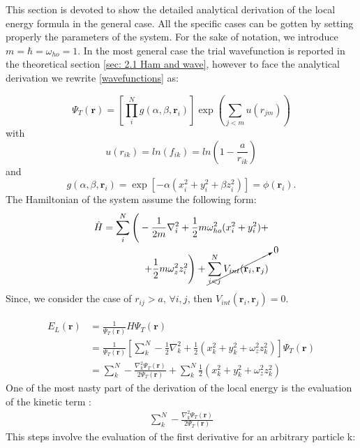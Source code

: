 
This section is devoted to show the detailed analytical derivation of the local energy formula in the general case. All the specific cases can be gotten by setting properly the parameters of the system.
For the sake of notation, we introduce $m=\hbar=\omega_{ho}=1$.  
In the most general case the trial wavefunction is reported in the theoretical section \ref{sec: 2.1 Ham and wave}, however to face the analytical derivation we rewrite \ref{wavefunctions} as:

\begin{equation*}
    \Psi_T(\mathbf{r})=\left[ \prod_i^N g(\alpha,\beta,\mathbf{r}_i) \right] \exp{\left(\sum_{j<m}u(r_{jm})\right)}
\end{equation*} 
with 
\begin{equation}
    u(r_{ik})=ln(f_{ik})=ln(1-\frac{a}{r_{ik}})
    \label{eq: u_interaction}
\end{equation}
and
\begin{equation}
    g(\alpha,\beta,\mathbf{r}_i) = \exp{\left[-\alpha(x_i^2+y_i^2+\beta
    z_i^2)\right]}= \phi(\mathbf{r}_i).
    \label{eq:gauss}
\end{equation} 
The Hamiltonian of the system assume the following form: 
\begin{equation*}
    \begin{split}
    \hat{H} = \sum_i^N \Bigg( -\frac{1}{2m} \nabla_{i}^2 + \frac{1}{2} m \omega_{ho}^2 (x_i^2 + y_i^2) + \\ 
    +\frac{1}{2} m \omega_{z}^2 z_i^2\Bigg) 
    + \cancelto{0}{\sum_{i<j}^{N} V_{int}({\mathbf{r}}_i,{\mathbf{r}}_j)} 
    \end{split}
\end{equation*}
Since, we consider the %
case of $r_{ij}>a,\, \forall i,j$, then  $V_{int}(\mathbf{r}_i,\mathbf{r}_j) = 0$.


\begin{align}
    E_L(\mathbf{r}) &= \frac{1}{\Psi_T(\mathbf{r})} \hat{H} \Psi_T(\mathbf{r}) \nonumber\\
    &= \frac{1}{\Psi_T(\mathbf{r})}
     \left[ \sum_k^N  -\frac{1}{2} \nabla_{k}^2 + \frac{1}{2} \left(x_k^2 + y_k^2 + \omega_{z}^2 z_k^2 \right) \right]
    \Psi_T(\mathbf{r}) \nonumber\\
    &= \sum_k^N -\frac{\nabla_{k}^2\Psi_T(\mathbf{r})}{{2\Psi_T(\mathbf{r})}} +\sum_k^N \frac{1}{2} \left(x_k^2 + y_k^2 + \omega_{z}^2 z_k^2 \right) 
    \label{eq: localenergy_appendix}
\end{align}
One of the most nasty part of the derivation of the local energy is the evaluation of the kinetic term : 
\begin{align*}
    \sum_k^N -\frac{\nabla_{k}^2\Psi_T(\mathbf{r})}{{2\Psi_T(\mathbf{r})}}
\end{align*}
This steps involve the evaluation of the first derivative for an arbitrary particle k: 

